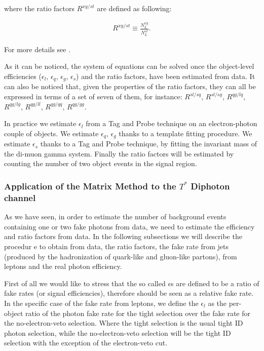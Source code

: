 where the ratio factors $R^{xy/st}$ are defined as following:

\begin{eqnarray}
R^{xy/st} \equiv \frac{N_{L}^{xy}}{N_{L}^{st}}. \label{eq:R1}
\end{eqnarray}

For more details see \cite{MMDiphotonAN}.

As it can be noticed, the system of equations can be solved once the object-level efficiencies ($\epsilon_l$, $\epsilon_q$, $\epsilon_g$, $\epsilon_s$) and the ratio factors, have been estimated from data. It can also be noticed that, given the properties of the ratio factors, they can all be expressed in terms of a set of seven of them, for instance: $R^{sl/sq}$, $R^{sl/sg}$, $R^{qg/lq}$, $R^{qg/lg}$, $R^{qg/ll}$, $R^{qg/qq}$, $R^{qg/gg}$.


In practice we estimate $\epsilon_l$ from a Tag and Probe technique on an electron-photon couple of objects. We estimate $\epsilon_q$, $\epsilon_g$ thanks to a template fitting procedure. We estimate $\epsilon_s$ thanks to a Tag and Probe technique, by fitting the invariant mass of the di-muon gamma system. Finally the ratio factors will be estimated by counting the number of two object events in the signal region.


\subsubsection{Application of the Matrix Method to the $T^{*}$ Diphoton channel}

As we have seen, in order to estimate the number of background events containing one or two fake photons from data, we need to estimate the efficiency and ratio factors from data. In the following subsections we will describe the 
procedur
e to obtain from data, the ratio factors, the fake rate from jets (produced by the hadronization of quark-like and gluon-like partons), from leptons and the real photon efficiency.


First of all we would like to stress that the so called $\epsilon$s are defined to be a ratio of fake rates (or signal efficiencies), therefore should be seen as a relative fake rate. In the specific case of the fake rate from 
leptons, we
 define the $\epsilon_{l}$ as the per-object ratio of the photon fake rate for the tight selection over the fake rate for the no-electron-veto selection. Where the tight selection is the usual tight ID photon selection, while the 
no-electron-veto selection will be the tight ID selection with the exception of the electron-veto cut.


